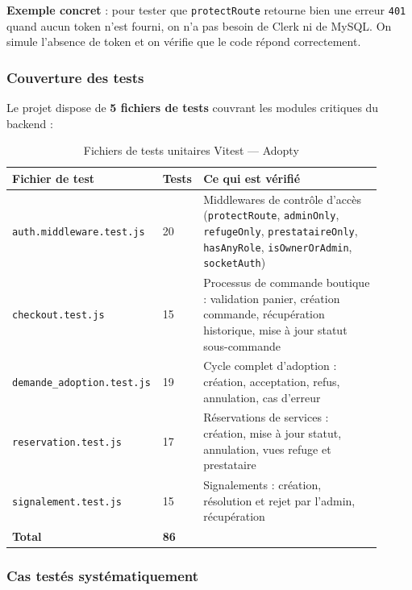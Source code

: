\documentclass[12pt,a4paper]{report}
\begin{document}
\textbf{Exemple concret} : pour tester que \texttt{protectRoute} retourne bien une erreur \texttt{401} quand aucun token n'est fourni, on n'a pas besoin de Clerk ni de MySQL. On simule l'absence de token et on vérifie que le code répond correctement.

\subsubsection{Couverture des tests}

Le projet dispose de \textbf{5 fichiers de tests} couvrant les modules critiques du backend :

\begin{table}[H]
\centering
\begin{tabular}{@{}L{0.35\linewidth}C{0.08\linewidth}L{0.48\linewidth}@{}}
\toprule
\textbf{Fichier de test} & \textbf{Tests} & \textbf{Ce qui est vérifié} \\
\midrule
\texttt{auth.middleware.test.js} & 20 & Middlewares de contrôle d'accès (\texttt{protectRoute}, \texttt{adminOnly}, \texttt{refugeOnly}, \texttt{prestataireOnly}, \texttt{hasAnyRole}, \texttt{isOwnerOrAdmin}, \texttt{socketAuth}) \\
\texttt{checkout.test.js} & 15 & Processus de commande boutique : validation panier, création commande, récupération historique, mise à jour statut sous-commande \\
\texttt{demande\_adoption.test.js} & 19 & Cycle complet d'adoption : création, acceptation, refus, annulation, cas d'erreur \\
\texttt{reservation.test.js} & 17 & Réservations de services : création, mise à jour statut, annulation, vues refuge et prestataire \\
\texttt{signalement.test.js} & 15 & Signalements : création, résolution et rejet par l'admin, récupération \\
\midrule
\textbf{Total} & \textbf{86} & \\
\bottomrule
\end{tabular}
\caption{Fichiers de tests unitaires Vitest --- Adopty}
\label{tab:vitest}
\end{table}

\subsubsection{Cas testés systématiquement}
\end{document}
